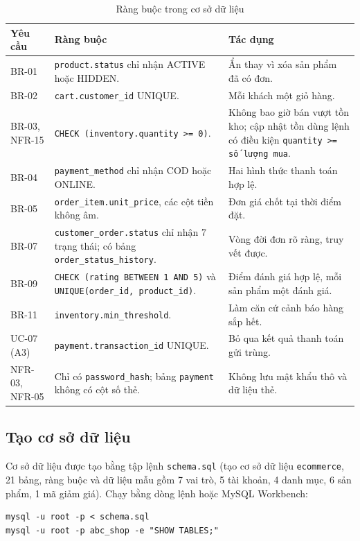 \documentclass[12pt,a4paper,oneside]{report}
\begin{document}
\begin{longtable}{p{2.6cm}p{6.4cm}p{6.8cm}}
\caption{Ràng buộc trong cơ sở dữ liệu}\\
\toprule
\textbf{Yêu cầu} & \textbf{Ràng buộc} & \textbf{Tác dụng} \\
\midrule
\endhead
\bottomrule
\endlastfoot
BR-01 & \texttt{product.status} chỉ nhận ACTIVE hoặc HIDDEN. & Ẩn thay vì xóa sản phẩm đã có đơn. \\
BR-02 & \texttt{cart.customer\_id} UNIQUE. & Mỗi khách một giỏ hàng. \\
BR-03, NFR-15 & \texttt{CHECK (inventory.quantity >= 0)}. & Không bao giờ bán vượt tồn kho; cập nhật tồn dùng lệnh có điều kiện \texttt{quantity >= số lượng mua}. \\
BR-04 & \texttt{payment\_method} chỉ nhận COD hoặc ONLINE. & Hai hình thức thanh toán hợp lệ. \\
BR-05 & \texttt{order\_item.unit\_price}, các cột tiền không âm. & Đơn giá chốt tại thời điểm đặt. \\
BR-07 & \texttt{customer\_order.status} chỉ nhận 7 trạng thái; có bảng \texttt{order\_status\_history}. & Vòng đời đơn rõ ràng, truy vết được. \\
BR-09 & \texttt{CHECK (rating BETWEEN 1 AND 5)} và \texttt{UNIQUE(order\_id, product\_id)}. & Điểm đánh giá hợp lệ, mỗi sản phẩm một đánh giá. \\
BR-11 & \texttt{inventory.min\_threshold}. & Làm căn cứ cảnh báo hàng sắp hết. \\
UC-07 (A3) & \texttt{payment.transaction\_id} UNIQUE. & Bỏ qua kết quả thanh toán gửi trùng. \\
NFR-03, NFR-05 & Chỉ có \texttt{password\_hash}; bảng \texttt{payment} không có cột số thẻ. & Không lưu mật khẩu thô và dữ liệu thẻ. \\
\end{longtable}

\subsection{Tạo cơ sở dữ liệu}

Cơ sở dữ liệu được tạo bằng tập lệnh \texttt{schema.sql} (tạo cơ sở dữ liệu \texttt{ecommerce}, 21 bảng, ràng buộc và dữ liệu mẫu gồm 7 vai trò, 5 tài khoản, 4 danh mục, 6 sản phẩm, 1 mã giảm giá). Chạy bằng dòng lệnh hoặc MySQL Workbench:

\begin{verbatim}
mysql -u root -p < schema.sql
mysql -u root -p abc_shop -e "SHOW TABLES;"
\end{verbatim}
\end{document}
